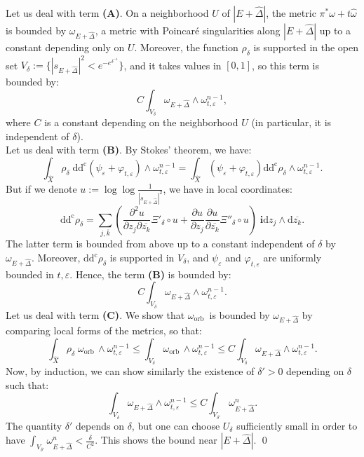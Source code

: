 \documentclass[12pt,a4paper]{amsart}
\newcommand{\orb}{\mathrm{orb}\,}
\newcommand{\ddc}{\mathrm{dd^c}}
\theoremstyle{plain}
\theoremstyle{definition}
\begin{document}
Let us deal with term \textbf{(A)}. On a neighborhood $U$ of $|E + \widehat{\Delta}|$, the metric $\pi^* \omega + t \widehat{\omega}$ is bounded by $\omega_{E + \widehat{\Delta}}$, a metric with Poincar\'e singularities along $|E + \widehat{\Delta}|$ up to a constant depending only on $U$. Moreover, the function $\rho_\delta$ is supported in the open set $V_\delta := \lbrace |s_{E + \widehat{\Delta}}|^2 < e^{-e^{\delta^{-1}}} \rbrace$, and it takes values in $\left[ 0,1 \right]$, so this term is bounded by:
$$
C \int_{V_\delta} \omega_{E + \widehat{\Delta}} \wedge \omega_{t, \varepsilon}^{n-1},
$$
where $C$ is a constant depending on the neighborhood $U$ (in particular, it is independent of $\delta$).\\

Let us deal with term \textbf{(B)}. By Stokes' theorem, we have:
$$
 \int_{\widehat{X}} \rho_\delta \; \ddc \left( \psi_\varepsilon + \varphi_{t, \varepsilon} \right) \wedge \omega_{t, \varepsilon}^{n-1} = \int_{\widehat{X}} \left( \psi_\varepsilon + \varphi_{t, \varepsilon} \right)\ddc \rho_\delta  \wedge \omega_{t, \varepsilon}^{n-1}.
$$
But if we denote $u := \log \log \frac{1}{|s_{E + \widehat{\Delta}}|^2}$, we have in local coordinates:
$$
\ddc \rho_\delta = \sum_{j, \overline{k}} \left(\frac{\partial^2 u }{\partial z_j \partial \overline{z_k}} \Xi'_\delta \circ u + \frac{\partial u }{\partial z_j}\frac{\partial u }{\partial \overline{z_k}} \Xi''_\delta \circ u \right)\; \textbf{i}\mathrm{d} z_j \wedge \mathrm{d}\overline{z_k}.
$$
The latter term is bounded from above up to a constant independent of $\delta$ by $\omega_{E + \widehat{\Delta}}$. Moreover, $\ddc \rho_\delta$ is supported in $V_\delta$, and $\psi_\varepsilon$ and $\varphi_{t, \varepsilon}$ are uniformly bounded in $t, \varepsilon$. Hence, the term \textbf{(B)} is bounded by:
$$
C\int_{V_\delta} \omega_{E + \widehat{\Delta}} \wedge \omega_{t, \varepsilon}^{n-1}.
$$
Let us deal with term \textbf{(C)}. We show that $\omega_\orb$ is bounded by $\omega_{E + \widehat{\Delta}}$ by comparing local forms of the metrics, so that:
$$
\int_{\widehat{X}} \rho_\delta \; \omega_\orb \wedge \omega_{t, \varepsilon}^{n-1} \leq \int_{V_\delta} \omega_\orb \wedge \omega_{t, \varepsilon}^{n-1} \leq C \int_{V_\delta} \omega_{E + \widehat{\Delta}} \wedge \omega_{t, \varepsilon}^{n-1}.
$$
Now, by induction, we can show similarly the existence of $\delta' > 0$ depending on $\delta$ such that:
$$
\int_{V_\delta} \omega_{E + \widehat{\Delta}} \wedge \omega_{t, \varepsilon}^{n-1}  \leq C \int_{V_{\delta'}} \omega_{E + \widehat{\Delta}}^n.
$$
The quantity $\delta'$ depends on $\delta$, but one can choose $U_\delta$ sufficiently small in order to have $\displaystyle \int_{V_{\delta'}} \omega_{E + \widehat{\Delta}}^n < \frac{\delta}{C^2}$. This shows the bound near $|E + \widehat{\Delta}|$. \qed \\
\end{document}
